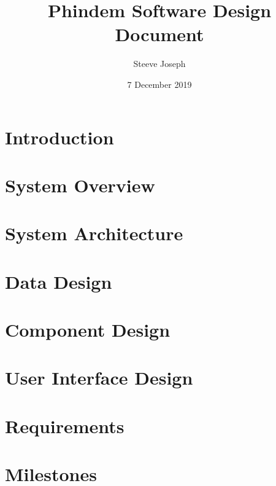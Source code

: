 \documentclass[twoside]{report}
\title{Phindem Software Design Document}
\author{Steeve Joseph}
\date{7 December 2019}
\begin{document}
\maketitle
\tableofcontents
\listoffigures
\listoftables


\chapter{Introduction}


\chapter{System Overview}


\chapter{System Architecture}


\chapter{Data Design}


\chapter{Component Design}


\chapter{User Interface Design}


\chapter{Requirements}


\chapter{Milestones}

\end{document}
